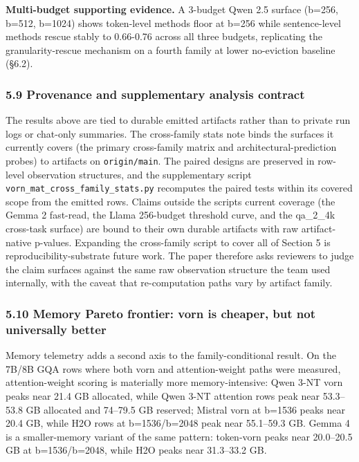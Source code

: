 \documentclass[
]{article}
\begin{document}
\textbf{Multi-budget supporting evidence.} A 3-budget Qwen 2.5 surface
(b=256, b=512, b=1024) shows token-level methods floor at b=256 while
sentence-level methods rescue stably to 0.66-0.76 across all three
budgets, replicating the granularity-rescue mechanism on a fourth
family at lower no-eviction baseline (§6.2).

\subsubsection{5.9 Provenance and supplementary analysis
contract}\label{59-provenance-and-supplementary-analysis-contract}

The results above are tied to durable emitted artifacts rather than to
private run logs or chat-only summaries. The cross-family stats note
binds the surfaces it currently covers (the primary cross-family matrix
and architectural-prediction probes) to artifacts on
\texttt{origin/main}. The paired designs are preserved in row-level
observation structures, and the supplementary script
\texttt{vorn\_mat\_cross\_family\_stats.\allowbreak{}py} recomputes the paired tests
within its covered scope from the emitted rows. Claims outside the
script\textquotesingle s current coverage (the Gemma 2 fast-read, the
Llama 256-budget threshold curve, and the qa\_2\_4k cross-task surface)
are bound to their own durable artifacts with raw artifact-native
p-values. Expanding the cross-family script to cover all of Section 5 is
reproducibility-substrate future work. The paper therefore asks
reviewers to judge the claim surfaces against the same raw observation
structure the team used internally, with the caveat that re-computation
paths vary by artifact family.

\subsubsection{5.10 Memory Pareto frontier: vorn is cheaper, but not
universally better}\label{5-10-memory-pareto-frontier}

Memory telemetry adds a second axis to the family-conditional result. On
the 7B/8B GQA rows where both vorn and attention-weight paths were
measured, attention-weight scoring is materially more memory-intensive:
Qwen 3-NT vorn peaks near 21.4 GB allocated, while Qwen 3-NT attention
rows peak near 53.3--53.8 GB allocated and 74--79.5 GB reserved; Mistral
vorn at b=1536 peaks near 20.4 GB, while H2O rows at b=1536/b=2048 peak
near 55.1--59.3 GB. Gemma 4 is a smaller-memory variant of the same
pattern: token-vorn peaks near 20.0--20.5 GB at b=1536/b=2048, while H2O
peaks near 31.3--33.2 GB.
\end{document}
